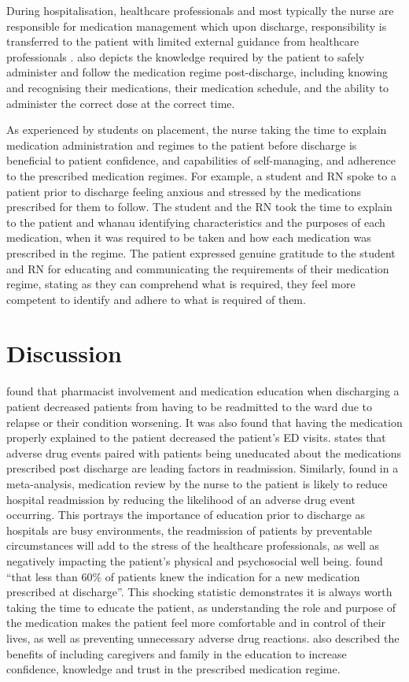 \documentclass[british,12pt,a4paper]{article}
\begin{document}
	During hospitalisation, healthcare professionals and most typically the nurse are responsible for medication management which upon discharge, responsibility is transferred to the patient with limited external guidance from healthcare professionals \parencite{Mortelmans2021}. \textcite{Mortelmans2021} also depicts the knowledge required by the patient to safely administer and follow the medication regime post-discharge, including knowing and recognising their medications, their medication schedule, and the ability to administer the correct dose at the correct time. 

	As experienced by students on placement, the nurse taking the time to explain medication administration and regimes to the patient before discharge is beneficial to patient confidence, and capabilities of self-managing, and adherence to the prescribed medication regimes. For example, a student and RN spoke to a patient prior to discharge feeling anxious and stressed by the medications prescribed for them to follow. The student and the RN took the time to explain to the patient and whanau identifying characteristics and the purposes of each medication, when it was required to be taken and how each medication was prescribed in the regime. The patient expressed genuine gratitude to the student and RN for educating and communicating the requirements of their medication regime, stating as they can comprehend what is required, they feel more competent to identify and adhere to what is required of them. 

	\section{Discussion}
	\textcite{Phatak2015} found that pharmacist involvement and medication education when discharging a patient decreased patients from having to be readmitted to the ward due to relapse or their condition worsening. It was also found that having the medication properly explained to the patient decreased the patient's ED visits. \citeauthor{Phatak2015} states that adverse drug events paired with patients being uneducated about the medications prescribed post discharge are leading factors in readmission. Similarly, \textcite{Alper2023} found in a meta-analysis, medication review by the nurse to the patient is likely to reduce hospital readmission by reducing the likelihood of an adverse drug event occurring. This portrays the importance of education prior to discharge as hospitals are busy environments, the readmission of patients by preventable circumstances will add to the stress of the healthcare professionals, as well as negatively impacting the patient's physical and psychosocial well being. \citeauthor{Phatak2015} found “that less than 60\% of patients knew the indication for a new medication prescribed at discharge”. This shocking statistic demonstrates it is always worth taking the time to educate the patient, as understanding the role and purpose of the medication makes the patient feel more comfortable and in control of their lives, as well as preventing unnecessary adverse drug reactions. \citeauthor{Alper2023} also described the benefits of including caregivers and family in the education to increase confidence, knowledge and trust in the prescribed medication regime. 
\end{document}
